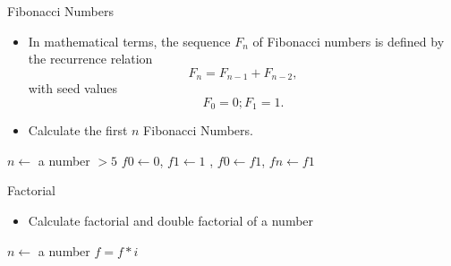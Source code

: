 \documentclass[10pt,t]{beamer}
\begin{document}
\begin{frame}{Fibonacci Numbers}
  \begin{itemize}
  \item In mathematical terms, the sequence $F_n$ of Fibonacci numbers is defined by the recurrence relation
    \begin{equation*}
      F_n = F_{n-1} + F_{n-2},
    \end{equation*}
    with seed values
    \begin{equation*}
      F_0 = 0 ;  F_1 = 1.
    \end{equation*}
  \item Calculate the first $n$ Fibonacci Numbers.
  \end{itemize}
  \begin{algorithm}[H]
    \caption{Pseudo Code to calculate sequence of Fibinacci Numbers}
    \begin{algorithmic}
      \State $n \gets$ a number $> 5$
      \State $f0 \gets 0$, $f1 \gets 1$
      , {$f0 \gets f1$}, {$fn \gets f1$}
      \EndDo
    \end{algorithmic}
  \end{algorithm}
\end{frame}

\begin{frame}{Factorial}
  \begin{itemize}
  \item Calculate factorial and double factorial of a number
  \end{itemize}
  \begin{algorithm}[H]
    \caption{Pseudo Code for Factorial}
    \begin{algorithmic}
      \State $n \gets$ a number
      \State $f = f * i$
      \EndDo
    \end{algorithmic}
  \end{algorithm}
\end{frame}
  
\end{document}
